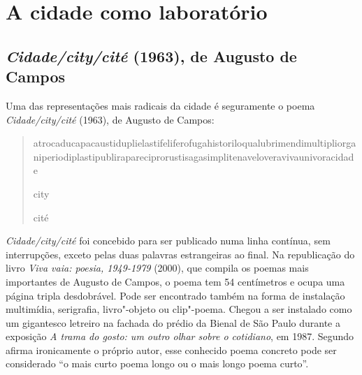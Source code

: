 \part{A cidade como laboratório}

\chapter{\emph{Cidade/city/cité} (1963), de Augusto de Campos}

Uma das representações mais radicais da cidade é seguramente o poema
\emph{Cidade/city/cité} (1963), de Augusto de Campos:

\begin{quote}
atrocaducapacaustiduplielastifeliferofugahistoriloqualubrimendimultipliorganiperiodiplastipublirapareciprorustisagasimplitenaveloveravivaunivoracidade

\hfill{city}

\hfill{cité}
\end{quote}

\emph{Cidade/city/cité} foi concebido para ser publicado numa linha
contínua, sem interrupções, exceto pelas duas palavras estrangeiras ao
final. Na republicação do livro \emph{Viva vaia: poesia, 1949-1979}
(2000), que compila os poemas mais importantes de Augusto de Campos, o
poema tem 54 centímetros e ocupa uma página tripla desdobrável. Pode ser
encontrado também na forma de instalação multimídia, serigrafia,
livro"-objeto ou clip"-poema. Chegou a ser instalado como um
gigantesco letreiro na fachada do prédio da Bienal de São Paulo durante
a exposição \emph{A trama do gosto: um outro olhar sobre o cotidiano},
em 1987. Segundo afirma ironicamente o próprio autor, esse conhecido
poema concreto pode ser considerado ``o mais curto poema longo ou o mais
longo poema curto''.

